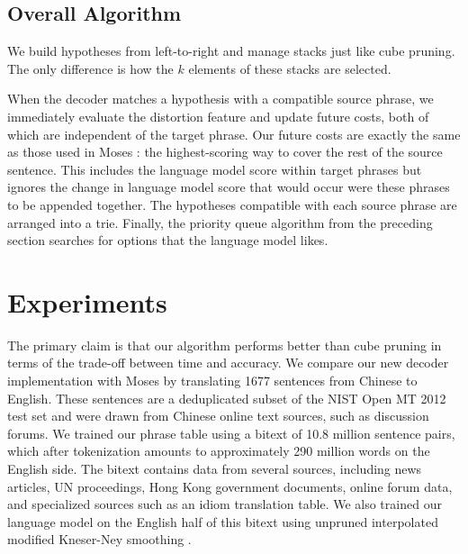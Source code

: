\documentclass[11pt]{article}
\begin{document}
\subsection{Overall Algorithm}
We build hypotheses from left-to-right and manage stacks just like cube pruning. The only difference is how the $k$ elements of these stacks are selected.  

When the decoder matches a hypothesis with a compatible source phrase, we immediately evaluate the distortion feature and update future costs, both of which are independent of the target phrase.  Our future costs are exactly the same as those used in Moses \cite{moses}: the highest-scoring way to cover the rest of the source sentence.  This includes the language model score within target phrases but ignores the change in language model score that would occur were these phrases to be appended together.  The hypotheses compatible with each source phrase are arranged into a trie.  Finally, the priority queue algorithm from the preceding section searches for options that the language model likes.    

\section{Experiments}
The primary claim is that our algorithm performs better than cube pruning in terms of the trade-off between time and accuracy.  We compare our new decoder implementation with Moses \cite{moses} by translating 1677 sentences from Chinese to English.  These sentences are a deduplicated subset of the NIST Open MT 2012 test set and were drawn from Chinese online text sources, such as discussion forums.  We trained our phrase table using a bitext of 10.8 million sentence pairs, which after tokenization amounts to approximately 290 million words on the English side. The bitext contains data from several sources, including news articles, UN proceedings, Hong Kong government documents, online forum data, and specialized sources such as an idiom translation table. We also trained our language model on the English half of this bitext using unpruned interpolated modified Kneser-Ney smoothing \cite{kn,kn-modified}. 

\end{document}
